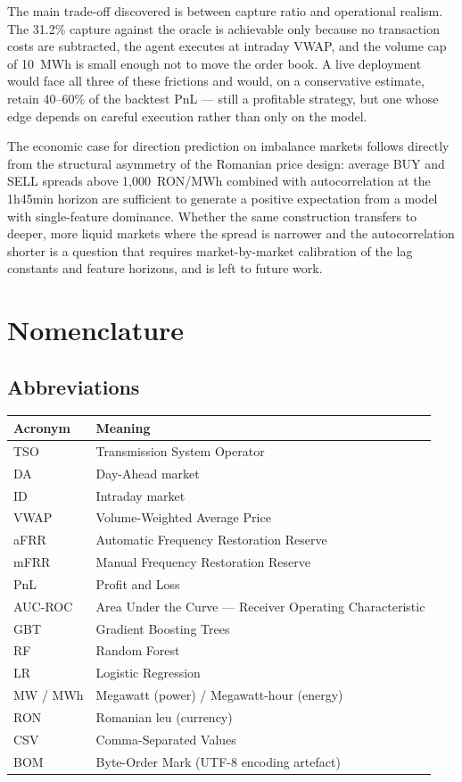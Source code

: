 \documentclass{article}
\begin{document}
The main trade-off discovered is between capture ratio and operational realism. The 31.2\% capture against the oracle is achievable only because no transaction costs are subtracted, the agent executes at intraday VWAP, and the volume cap of 10~MWh is small enough not to move the order book. A live deployment would face all three of these frictions and would, on a conservative estimate, retain 40--60\% of the backtest PnL --- still a profitable strategy, but one whose edge depends on careful execution rather than only on the model.

The economic case for direction prediction on imbalance markets follows directly from the structural asymmetry of the Romanian price design: average BUY and SELL spreads above 1{,}000~RON/MWh combined with autocorrelation at the 1h45min horizon are sufficient to generate a positive expectation from a model with single-feature dominance. Whether the same construction transfers to deeper, more liquid markets where the spread is narrower and the autocorrelation shorter is a question that requires market-by-market calibration of the lag constants and feature horizons, and is left to future work.

\onecolumn
\appendix

\section{Nomenclature}

\subsection*{Abbreviations}

\begin{table}[H]
\centering
\begin{tabular}{ll}
\toprule
\textbf{Acronym} & \textbf{Meaning} \\
\midrule
TSO & Transmission System Operator \\
DA & Day-Ahead market \\
ID & Intraday market \\
VWAP & Volume-Weighted Average Price \\
aFRR & Automatic Frequency Restoration Reserve \\
mFRR & Manual Frequency Restoration Reserve \\
PnL & Profit and Loss \\
AUC-ROC & Area Under the Curve --- Receiver Operating Characteristic \\
GBT & Gradient Boosting Trees \\
RF & Random Forest \\
LR & Logistic Regression \\
MW / MWh & Megawatt (power) / Megawatt-hour (energy) \\
RON & Romanian leu (currency) \\
CSV & Comma-Separated Values \\
BOM & Byte-Order Mark (UTF-8 encoding artefact) \\
\bottomrule
\end{tabular}
\end{table}
\end{document}
